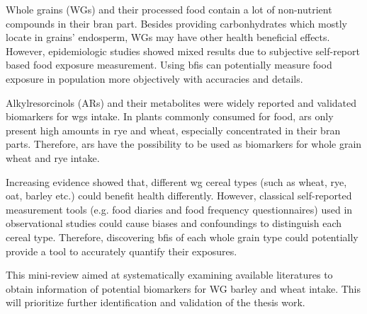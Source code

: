 Whole grains (WGs) and their processed food contain a lot of non-nutrient compounds in their bran part. Besides providing carbonhydrates which mostly locate in grains' endosperm, WGs may have other health beneficial effects. However, epidemiologic studies showed mixed results due to subjective self-report based food exposure measurement\cite{ISI:000447355100002}. Using \acrfull{bfis} can potentially measure food exposure in population more objectively with accuracies and details\cite{Scalbert2014}.

Alkylresorcinols (ARs) and their metabolites were widely reported and validated biomarkers for \acrshort{wgs} intake. 
In plants commonly consumed for food, \acrshort{ars} only present high amounts in rye and wheat, especially concentrated in their bran parts\cite{arreview2004}. Therefore, \acrshort{ars} have the possibility to be used as biomarkers for whole grain wheat and rye intake.

Increasing evidence showed that, different \acrshort{wg} cereal types (such as wheat, rye, oat, barley etc.) could benefit health differently. 
However, classical self-reported measurement tools (e.g. food diaries and food frequency questionnaires) used in observational studies could cause biases and confoundings to distinguish each cereal type.
Therefore, discovering \acrshort{bfis} of each whole grain type could potentially provide a tool to accurately quantify their exposures. 

This mini-review aimed at systematically examining available literatures to obtain information of potential biomarkers for WG barley and wheat intake. This will prioritize further identification and validation of the thesis work.